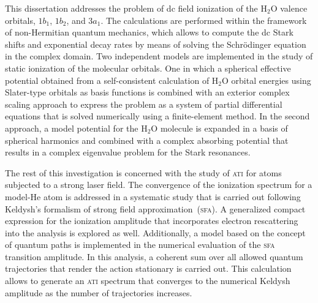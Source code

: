 










This dissertation addresses the problem of dc field ionization of the
H$_{2}$O valence orbitals, $1b_{1}$, $1b_{2}$, and $3a_{1}$. The
calculations are performed within the framework of non-Hermitian
quantum mechanics, which allows to compute the dc Stark shifts and
exponential decay rates by means of solving the Schr\"{o}dinger
equation in the complex domain. Two independent models are implemented
in the study of static ionization of the molecular orbitals. One in
which a spherical effective potential obtained from a self-consistent
calculation of H$_{2}$O orbital energies using Slater-type orbitals as
basis functions is combined with an exterior complex scaling approach
to express the problem as a system of partial differential equations
that is solved numerically using a finite-element method. In the
second approach, a model potential for the H$_{2}$O molecule is
expanded in a basis of spherical harmonics and combined with a complex
absorbing potential that results in a complex eigenvalue problem for
the Stark resonances.

The rest of this investigation is concerned with the study of
\textsc{ati} for atoms subjected to a strong laser field. The
convergence of the ionization spectrum for a model-He atom is
addressed in a systematic study that is carried out following
Keldysh's formalism of strong field approximation~(\textsc{sfa}). A
generalized compact expression for the ionization amplitude that
incorporates electron rescattering into the analysis is explored as
well. Additionally, a model based on the concept of quantum paths is
implemented in the numerical evaluation of the \textsc{sfa} transition
amplitude. In this analysis, a coherent sum over all allowed quantum
trajectories that render the action stationary is carried out. This
calculation allows to generate an \textsc{ati} spectrum that converges
to the numerical Keldysh amplitude as the number of trajectories
increases.






